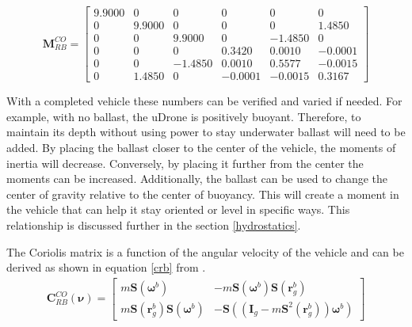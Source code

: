 \begin{equation}
\boldsymbol{M}_{R B}^{C O}=\left[\begin{array}{cccccc}
9.9000 & 0 & 0 & 0 & 0 & 0 \\
0 & 9.9000 & 0 & 0 & 0 & 1.4850 \\
0 & 0 & 9.9000 & 0 & -1.4850 & 0 \\
0 & 0 & 0 & 0.3420 & 0.0010 & -0.0001 \\
0 & 0 & -1.4850 & 0.0010 & 0.5577 & -0.0015 \\
0 & 1.4850 & 0 & -0.0001 & -0.0015 & 0.3167
\end{array}\right]
\label{m_matrix}
\end{equation}


With a completed vehicle these numbers can be verified and varied if needed. For example, with no ballast, the uDrone is positively buoyant. Therefore, to maintain its depth without using power to stay underwater ballast will need to be added. By placing the ballast closer to the center of the vehicle, the moments of inertia will decrease. Conversely, by placing it further from the center the moments can be increased. Additionally, the ballast can be used to change the center of gravity relative to the center of buoyancy. This will create a moment in the vehicle that can help it stay oriented or level in specific ways. This relationship is discussed further in the section \ref{hydrostatics}. 

The Coriolis matrix is a function of the angular velocity of the vehicle and can be derived as shown in equation \ref{crb} from \cite{thor_rb}.
\begin{gather}
    \boldsymbol{C}_{RB}^{CO}(\boldsymbol{\nu})=\left[\begin{array}{cc}
        m \boldsymbol{S}\left(\boldsymbol{\omega}^{b}\right) & -m \boldsymbol{S}\left(\boldsymbol{\omega}^{b}\right) \boldsymbol{S}\left(\boldsymbol{r}_{g}^{b}\right) \\
        m \boldsymbol{S}\left(\boldsymbol{r}_{g}^{b}\right) \boldsymbol{S}\left(\boldsymbol{\omega}^{b}\right) & -\boldsymbol{S}\left(\left(\boldsymbol{I}_{g}-m \boldsymbol{S}^{2}\left(\boldsymbol{r}_{g}^{b}\right)\right) \boldsymbol{\omega}^{b}\right)
    \end{array}\right]
    \label{crb}
\end{gather}


